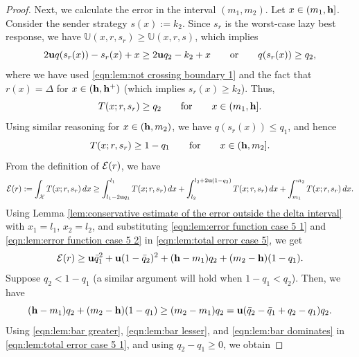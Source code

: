 \begin{proof}
        Next, we calculate the error in the interval $(m_1, m_2)$.
        Let $x \in (m_1, \mathbf{h}]$. Consider the sender strategy $s(x) := k_2$. Since $s_r$ is the worst-case lazy best response, we have $\mathbb{U}(x, r, s_r) \geq \mathbb{U}(x, r, s)$, which implies
        \[
        2\mathbf{u} q(s_r(x)) - s_r(x) + x \geq 2\mathbf{u} q_2 - k_2 + x \quad \hbox{\quad or\quad} \quad q(s_r(x)) \geq q_2,
        \]
        where we have used \eqref{eqn:lem:not crossing boundary 1} and the fact that $r(x) = \Delta$ for $x \in (\mathbf{h}, \mathbf{h^{+}})$ (which implies $s_r(x) \geq k_2$). Thus,
        \begin{equation}\label{eqn:lem:error function case 5 1}
            T(x; r, s_r) \geq q_2 \quad \hbox{\quad for\quad} \quad x \in (m_1, \mathbf{h}].
        \end{equation}
        Using similar reasoning for $x \in (\mathbf{h}, m_2)$, we have $q(s_r(x)) \leq q_1$, and hence
        \begin{equation}\label{eqn:lem:error function case 5 2}
            T(x; r, s_r) \geq 1 - q_1 \quad \hbox{\quad for\quad} \quad x \in (\mathbf{h}, m_2].
        \end{equation}
        From the definition of $\mathcal{E}(r)$, we have
        \begin{equation}\label{eqn:lem:total error case 5}
            \mathcal{E}(r) := \int_{\mathcal{X}} T(x; r, s_r) \, dx \geq \int_{l_1 - 2\mathbf{u} q_1}^{l_1} T(x; r, s_r) \, dx + \int_{l_2}^{l_2 + 2\mathbf{u} (1 - q_2)} T(x; r, s_r) \, dx + \int_{m_1}^{m_2} T(x; r, s_r) \, dx.
        \end{equation}
        Using Lemma \ref{lem:conservative estimate of the error outside the delta interval} with $x_1 = l_1$, $x_2 = l_2$, and substituting \eqref{eqn:lem:error function case 5 1} and \eqref{eqn:lem:error function case 5 2} in \eqref{eqn:lem:total error case 5}, we get
        \begin{equation}\label{eqn:lem:total error case 5 1}
            \mathcal{E}(r) \geq \mathbf{u} \bar{q}_1^2 + \mathbf{u}(1 - \bar{q}_2)^2 + (\mathbf{h} - m_1)q_2 + (m_2 - \mathbf{h})(1 - q_1).
        \end{equation}
        Suppose $q_2 < 1 - q_1$ (a similar argument will hold when $1 - q_1 < q_2$).
        Then, we have
        \begin{equation}\label{eqn:lem:bar dominates}
            (\mathbf{h} - m_1)q_2 + (m_2 - \mathbf{h})(1 - q_1) \geq (m_2 - m_1)q_2 = \mathbf{u}(\bar{q}_2 - \bar{q}_1 + q_2 - q_1)q_2.
        \end{equation}
        Using \eqref{eqn:lem:bar greater}, \eqref{eqn:lem:bar lesser}, and \eqref{eqn:lem:bar dominates} in \eqref{eqn:lem:total error case 5 1}, and using $q_2 - q_1 \geq 0$, we obtain

\end{proof}
